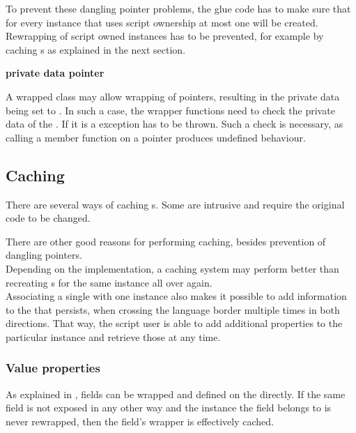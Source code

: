 To prevent these dangling pointer problems, the glue code has to make sure that for every  instance that uses script ownership at most one  will be created. Rewrapping of script owned instances has to be prevented, for example by caching s as explained in the next section.

\textbf{ private data  pointer}

A wrapped class may allow wrapping of  pointers, resulting in the private data being set to . In such a case, the wrapper functions need to check the private data of the  . If it is  a  exception has to be thrown. Such a check is necessary, as calling a member function on a  pointer produces undefined behaviour.

\subsection{Caching}

There are several ways of caching s. Some are intrusive and require the original  code to be changed.

There are other good reasons for performing caching, besides prevention of dangling pointers.\\
Depending on the implementation, a caching system may perform better than recreating s for the same  instance all over again.\\
Associating a single  with one  instance  also makes it possible to add information to the  that persists, when crossing the language border  multiple times in both directions. That way, the script user is able to add additional properties to the particular instance and retrieve those at any time.

\subsubsection{Value properties}

As explained in , fields can be wrapped and defined on the  directly. If the same field is not exposed in any other way and the instance the field belongs to is never rewrapped, then the field's wrapper  is effectively cached.

